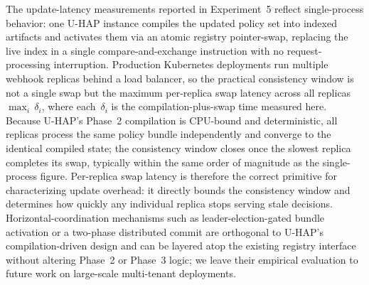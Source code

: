 The update-latency measurements reported in Experiment~5 reflect single-process behavior: one U-HAP instance compiles the updated policy set into indexed artifacts and activates them via an atomic registry pointer-swap, replacing the live index in a single compare-and-exchange instruction with no request-processing interruption.
Production Kubernetes deployments run multiple webhook replicas behind a load balancer, so the practical consistency window is not a single swap but the maximum per-replica swap latency across all replicas~$\max_{i}\,\delta_i$, where each~$\delta_i$ is the compilation-plus-swap time measured here.
Because U-HAP's Phase~2 compilation is CPU-bound and deterministic, all replicas process the same policy bundle independently and converge to the identical compiled state; the consistency window closes once the slowest replica completes its swap, typically within the same order of magnitude as the single-process figure.
Per-replica swap latency is therefore the correct primitive for characterizing update overhead: it directly bounds the consistency window and determines how quickly any individual replica stops serving stale decisions.
Horizontal-coordination mechanisms such as leader-election-gated bundle activation or a two-phase distributed commit are orthogonal to U-HAP's compilation-driven design and can be layered atop the existing registry interface without altering Phase~2 or Phase~3 logic; we leave their empirical evaluation to future work on large-scale multi-tenant deployments.
